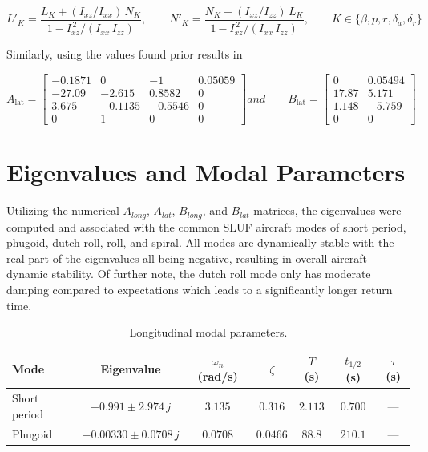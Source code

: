 \documentclass[11pt]{article}
\newcommand{\Ixx}{I_{xx}}
\newcommand{\Izz}{I_{zz}}
\newcommand{\Ixz}{I_{xz}}
\begin{document}
\begin{equation}\label{eq:equation_54}
L'_K = \frac{L_K + (\Ixz/\Ixx)\,N_K}{1 - \Ixz^{\,2}/(\Ixx\,\Izz)},
\qquad
N'_K = \frac{N_K + (\Ixz/\Izz)\,L_K}{1 - \Ixz^{\,2}/(\Ixx\,\Izz)},
\qquad K \in \{\beta, p, r, \delta_a, \delta_r\}
\end{equation}

Similarly, using the values found prior results in

\begin{equation}\label{eq:equation_55}
A_\text{lat} =
\begin{bmatrix}
-0.1871 & 0       & -1     & 0.05059 \\
-27.09  & -2.615  & 0.8582 & 0       \\
3.675   & -0.1135 & -0.5546 & 0      \\
0       & 1       & 0       & 0
\end{bmatrix} and
\qquad
B_\text{lat} =
\begin{bmatrix}
0     & 0.05494 \\
17.87 & 5.171   \\
1.148 & -5.759  \\
0     & 0
\end{bmatrix}
\end{equation}

\section{Eigenvalues and Modal Parameters}

Utilizing the numerical $A_{long}$, $A_{lat}$, $B_{long}$, and $B_{lat}$ matrices, the eigenvalues were computed and
associated with the common SLUF aircraft modes of short period, phugoid, dutch roll, roll, and spiral.
All modes are dynamically stable with the real part of the eigenvalues all being negative, resulting in overall
aircraft dynamic stability.
Of further note, the dutch roll mode only has moderate damping compared to expectations which leads to a significantly
longer return time.

\begin{table}[h]\label{tab:table_5}
\centering
\caption{Longitudinal modal parameters.}
\begin{tabular}{lcccccc}
\toprule
\textbf{Mode} & \textbf{Eigenvalue} & \textbf{$\omega_n$ (rad/s)} & \textbf{$\zeta$} & \textbf{$T$ (s)} & \textbf{$t_{1/2}$ (s)} & \textbf{$\tau$ (s)} \\
\midrule
Short period & $-0.991 \pm 2.974\,j$       & $3.135$  & $0.316$  & $2.113$ & $0.700$  & --- \\
Phugoid      & $-0.00330 \pm 0.0708\,j$    & $0.0708$ & $0.0466$ & $88.8$  & $210.1$  & --- \\
\bottomrule
\end{tabular}
\end{table}
\end{document}
